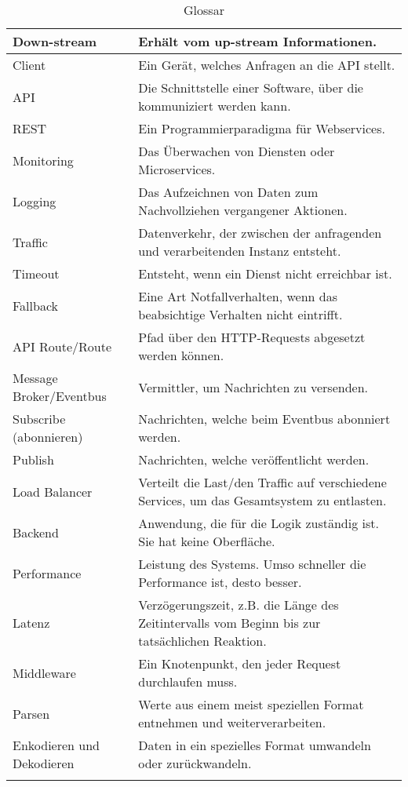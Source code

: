 \begin{longtable}{|l|p{10cm}|}
	Down-stream & Erhält vom up-stream Informationen.\\ \hline
	Client & Ein Gerät, welches Anfragen an die API stellt. \\ \hline
	API & Die Schnittstelle einer Software, über die kommuniziert werden kann.\\ \hline
	REST & Ein Programmierparadigma für Webservices. \\ \hline
	Monitoring & Das Überwachen von Diensten oder Microservices.\\ \hline
	Logging & Das Aufzeichnen von Daten zum Nachvollziehen vergangener Aktionen.\\ \hline
	Traffic & Datenverkehr, der zwischen der anfragenden und verarbeitenden Instanz entsteht.\\ \hline
	Timeout & Entsteht, wenn ein Dienst nicht erreichbar ist.\\ \hline
	Fallback & Eine Art Notfallverhalten, wenn das beabsichtige Verhalten nicht eintrifft.\\ \hline
	API Route/Route & Pfad über den HTTP-Requests abgesetzt werden können.\\ \hline
	Message Broker/Eventbus & Vermittler, um Nachrichten zu versenden.  \\ \hline
	Subscribe (abonnieren) & Nachrichten, welche beim Eventbus abonniert werden. \\ \hline
	Publish & Nachrichten, welche veröffentlicht werden. \\ \hline
	Load Balancer & Verteilt die Last/den Traffic auf verschiedene Services, um das Gesamtsystem zu entlasten.\\ \hline
	Backend & Anwendung, die für die Logik zuständig ist. Sie hat keine Oberfläche.\\ \hline
	Performance & Leistung des Systems. Umso schneller die Performance ist, desto besser.\\ \hline
	Latenz & Verzögerungszeit, z.B. die Länge des Zeitintervalls vom Beginn bis zur tatsächlichen Reaktion.\\ \hline
	Middleware & Ein Knotenpunkt, den jeder Request durchlaufen muss. \\ \hline
	Parsen & Werte aus einem meist speziellen Format entnehmen und weiterverarbeiten. \\ \hline 
	Enkodieren und Dekodieren & Daten in ein spezielles Format umwandeln oder zurückwandeln.\\ \hline
	\caption[Glossar]{Glossar}
\end{longtable}